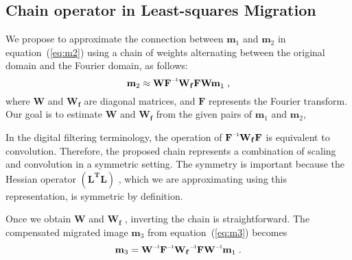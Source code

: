 \subsection*{Chain operator in Least-squares Migration}

We propose to approximate the connection between $\mathbf{m}_1$ and $\mathbf{m}_2$ in equation~(\ref{eq:m2}) using a chain of weights alternating between the original domain and the Fourier domain, as follows:
\begin{equation}
    \label{eq:wfw}
    \mathbf{m}_2 \approx \mathbf{W\inv{F}W_{f}FW m}_1\;,
\end{equation}
where $\mathbf{W}$ and $\mathbf{W_f}$ are diagonal matrices, and $\mathbf{F}$ represents the Fourier transform. Our goal is to estimate $\mathbf{W}$ and $\mathbf{W_f}$ from the given pairs of $\mathbf{m}_1$ and $\mathbf{m}_2$,

 In the digital filtering terminology, the operation of $\mathbf{\inv{F}W_{f}F}$ is equivalent to convolution. Therefore, the proposed chain represents a combination of scaling and convolution in a symmetric setting. The symmetry is important because the Hessian operator $\mathbf{(L^T L)}$ , which we are approximating using this representation, is symmetric by definition. 
 
 Once we obtain $\mathbf{W} $ and $ \mathbf{W_f }$ , inverting the chain is straightforward. The compensated migrated image $\mathbf{m}_3$ from equation~(\ref{eq:m3}) becomes
\begin{equation}
 \mathbf{
m}_{3} = 
\mathbf{\inv{W}\inv{F}\inv{W_f}F\inv{W} m}_1\;.
\label{lsmig}
\end{equation}
 



